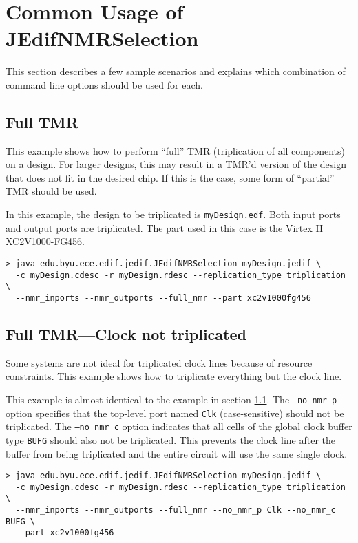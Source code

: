 \section{Common Usage of JEdifNMRSelection}
\label{sec:nmr_selection_examples}
This section describes a few sample scenarios and explains which combination of
command line options should be used for each.

\subsection{Full TMR}
\label{subsec:fulltmr}
This example shows how to perform ``full'' TMR (triplication of all components) 
on a design. For larger designs, this may result in a TMR'd version of the 
design that does not fit in the desired chip. If this is the case, some form of 
``partial'' TMR should be used.

In this example, the design to be triplicated is
\texttt{myDesign.edf}. Both input ports and output ports are triplicated. 
The part used in this case is the Virtex II XC2V1000-FG456.

\begin{verbatim}
> java edu.byu.ece.edif.jedif.JEdifNMRSelection myDesign.jedif \
  -c myDesign.cdesc -r myDesign.rdesc --replication_type triplication \
  --nmr_inports --nmr_outports --full_nmr --part xc2v1000fg456
\end{verbatim}
\subsection{Full TMR---Clock not triplicated}
Some systems are not ideal for triplicated clock lines because of resource
constraints. This example shows how to triplicate everything but the clock line.

This example is almost identical to the example in section 
\ref{subsec:fulltmr}. The \texttt{--no\_nmr\_p} option specifies that the 
top-level port named \texttt{Clk} (case-sensitive) should not be triplicated. 
The \texttt{--no\_nmr\_c} option indicates that all cells of the global clock 
buffer type \texttt{BUFG} should also not be triplicated. This prevents the 
clock line after the buffer from being triplicated and the entire circuit will 
use the same single clock.

\begin{verbatim}
> java edu.byu.ece.edif.jedif.JEdifNMRSelection myDesign.jedif \
  -c myDesign.cdesc -r myDesign.rdesc --replication_type triplication \
  --nmr_inports --nmr_outports --full_nmr --no_nmr_p Clk --no_nmr_c BUFG \
  --part xc2v1000fg456
\end{verbatim}

